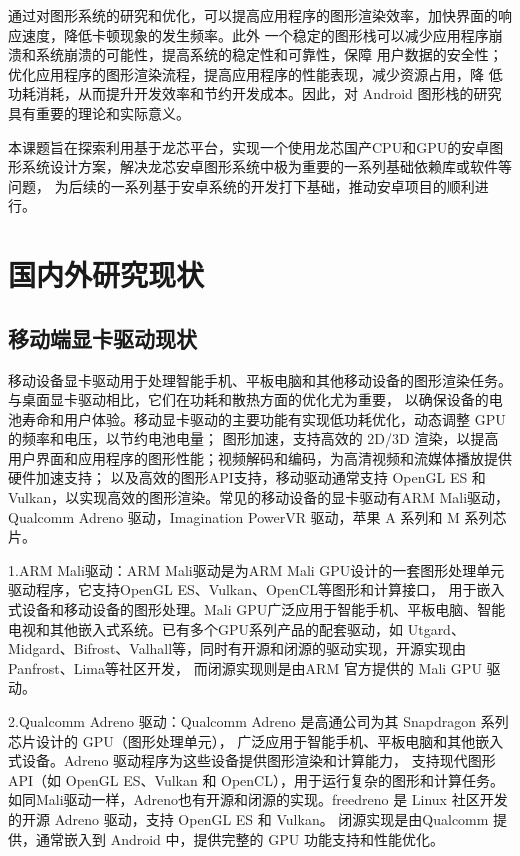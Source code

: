 通过对图形系统的研究和优化，可以提高应用程序的图形渲染效率，加快界面的响应速度，降低卡顿现象的发生频率。此外
一个稳定的图形栈可以减少应用程序崩溃和系统崩溃的可能性，提高系统的稳定性和可靠性，保障
用户数据的安全性；优化应用程序的图形渲染流程，提高应用程序的性能表现，减少资源占用，降
低功耗消耗，从而提升开发效率和节约开发成本。因此，对 Android 图形栈的研究具有重要的理论和实际意义。

本课题旨在探索利用基于龙芯平台，实现一个使用龙芯国产CPU和GPU的安卓图形系统设计方案，解决龙芯安卓图形系统中极为重要的一系列基础依赖库或软件等问题，
为后续的一系列基于安卓系统的开发打下基础，推动安卓项目的顺利进行。

\section{国内外研究现状}
\subsection{移动端显卡驱动现状}
移动设备显卡驱动用于处理智能手机、平板电脑和其他移动设备的图形渲染任务。与桌面显卡驱动相比，它们在功耗和散热方面的优化尤为重要，
以确保设备的电池寿命和用户体验。移动显卡驱动的主要功能有实现低功耗优化，动态调整 GPU 的频率和电压，以节约电池电量；
图形加速，支持高效的 2D/3D 渲染，以提高用户界面和应用程序的图形性能；视频解码和编码，为高清视频和流媒体播放提供硬件加速支持；
以及高效的图形API支持，移动驱动通常支持 OpenGL ES 和 Vulkan，以实现高效的图形渲染。常见的移动设备的显卡驱动有ARM Mali驱动，
Qualcomm Adreno 驱动，Imagination PowerVR 驱动，苹果 A 系列和 M 系列芯片。

1.ARM Mali驱动：ARM Mali驱动是为ARM Mali GPU设计的一套图形处理单元驱动程序，它支持OpenGL ES、Vulkan、OpenCL等图形和计算接口，
用于嵌入式设备和移动设备的图形处理。Mali GPU广泛应用于智能手机、平板电脑、智能电视和其他嵌入式系统。已有多个GPU系列产品的配套驱动，如
Utgard、Midgard、Bifrost、Valhall等，同时有开源和闭源的驱动实现，开源实现由Panfrost、Lima等社区开发，
而闭源实现则是由ARM 官方提供的 Mali GPU 驱动。

2.Qualcomm Adreno 驱动：Qualcomm Adreno 是高通公司为其 Snapdragon 系列芯片设计的 GPU（图形处理单元），
广泛应用于智能手机、平板电脑和其他嵌入式设备。Adreno 驱动程序为这些设备提供图形渲染和计算能力，
支持现代图形 API（如 OpenGL ES、Vulkan 和 OpenCL），用于运行复杂的图形和计算任务。
如同Mali驱动一样，Adreno也有开源和闭源的实现。freedreno 是 Linux 社区开发的开源 Adreno 驱动，支持 OpenGL ES 和 Vulkan。
闭源实现是由Qualcomm 提供，通常嵌入到 Android 中，提供完整的 GPU 功能支持和性能优化。

